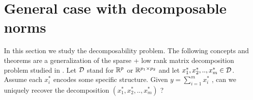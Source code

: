 \documentclass{article}
\begin{document}
%
%
%
%
%
%
%



\section{General case with decomposable norms}

In this section we study the decomposability problem. The following concepts and theorems are a generalization of the sparse + low rank matrix decomposition problem studied in \citet{chandrasekaran2011rank}. Let $\mathcal{D}$ stand for $\mathbb{R}^{p}$ or $\mathbb{R}^{p_{1} \times p_{2}}$ and let $x_{1}^*,x_{2}^*,..,x_{m}^*\in \mathcal{D}$. Assume each $x_{i}^*$ encodes some specific structure. Given $y=\sum_{i=1}^{m}x_{i}^*$ , can we uniquely recover the decomposition $(x_{1}^*,x_{2}^*,..,x_{m}^*)$ ? \\
\end{document}
